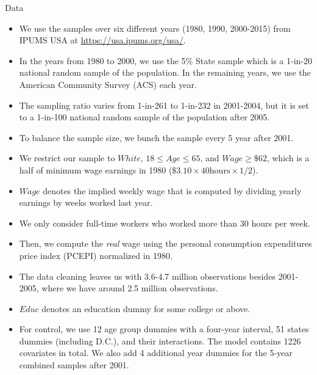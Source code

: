 \documentclass[beamer, t]{beamer}
\begin{document}
\begin{frame}[allowframebreaks]{Data}
	\begin{itemize}
		\item We use the samples over six different years (1980, 1990, 2000-2015) from IPUMS USA at \url{https://usa.ipums.org/usa/}. 
		
		\item
		In the years from 1980 to 2000, we use the 5\% State sample which is a 1-in-20 national random sample of the population. 
		In the remaining years, we use the American Community Survey (ACS) each year. 
		
		\item The sampling ratio varies from 1-in-261 to 1-in-232 in 2001-2004, but it is set to a 1-in-100 national random sample of the population after 2005. 
		
		\item
		To balance the sample size, we bunch the sample every 5 year after 2001. 
		
		\item We restrict our sample to $White$, $18 \le Age \le 65$,  and $Wage \ge \$62$, which is a half of minimum wage earnings in 1980 ($\$3.10 \times 40 \mbox{hours} \times 1/2$). 
		
		\item
		$Wage$ denotes the implied weekly wage that is computed by dividing yearly earnings by weeks worked last year. 
		\item
		We only consider full-time workers who worked more than 30 hours per week.
		
		\item
		Then, we compute the \textit{real} wage using the personal consumption expenditures price index (PCEPI) normalized in 1980. 
		
		\item
		The data cleaning leaves us with 3.6-4.7 million observations besides 2001-2005, where we have around 2.5 million observations.
		
		\item  $Educ$ denotes an education dummy for some college or above. 
		
		\item For control, we use 12 age group dummies with a four-year interval, 51 states dummies (including D.C.), and their interactions.
		The model contains 1226 covariates in total.
		We also add 4 additional year dummies for the 5-year combined samples after 2001. 
		

	\end{itemize}
\end{frame}
\end{document}

